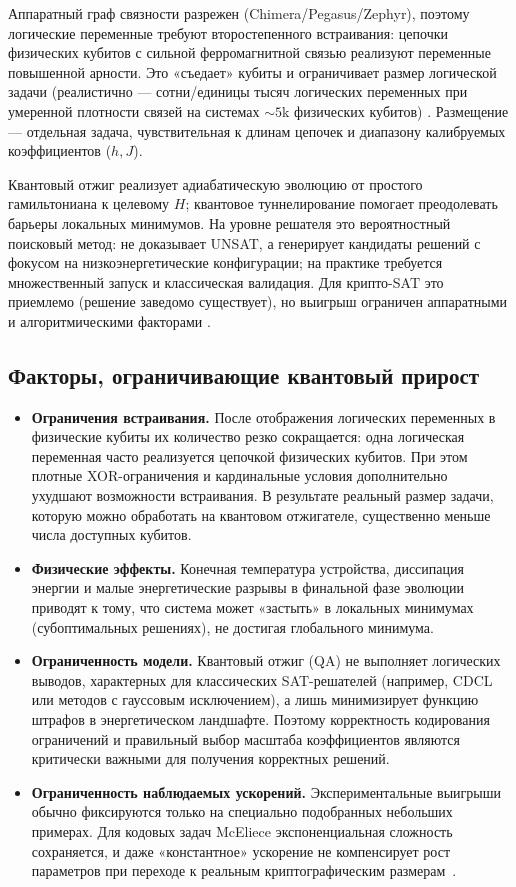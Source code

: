 Аппаратный граф связности разрежен (Chimera/Pegasus/Zephyr), поэтому логические переменные требуют второстепенного встраивания: цепочки физических кубитов с сильной ферромагнитной связью реализуют переменные повышенной арности. Это «съедает» кубиты и ограничивает размер логической задачи (реалистично --- сотни/единицы тысяч логических переменных при умеренной плотности связей на системах $\sim 5$k физических кубитов) \cite{DWaveDocs}. Размещение --- отдельная задача, чувствительная к длинам цепочек и диапазону калибруемых коэффициентов ($h, J$).

Квантовый отжиг реализует адиабатическую эволюцию от простого гамильтониана к целевому $H$; квантовое туннелирование помогает преодолевать барьеры локальных минимумов. На уровне решателя это вероятностный поисковый метод: не доказывает UNSAT, а генерирует кандидаты решений с фокусом на низкоэнергетические конфигурации; на практике требуется множественный запуск и классическая валидация. Для крипто-SAT это приемлемо (решение заведомо существует), но выигрыш ограничен аппаратными и алгоритмическими факторами \cite{Sirdey2023,Pei2025}.

\subsection*{Факторы, ограничивающие квантовый прирост}
\begin{itemize}
  \item \textbf{Ограничения встраивания.} После отображения логических переменных в физические кубиты их количество резко сокращается: одна логическая переменная часто реализуется цепочкой физических кубитов. При этом плотные XOR-ограничения и кардинальные условия дополнительно ухудшают возможности встраивания. В результате реальный размер задачи, которую можно обработать на квантовом отжигателе, существенно меньше числа доступных кубитов.
  
  \item \textbf{Физические эффекты.} Конечная температура устройства, диссипация энергии и малые энергетические разрывы в финальной фазе эволюции приводят к тому, что система может «застыть» в локальных минимумах (субоптимальных решениях), не достигая глобального минимума.
  
  \item \textbf{Ограниченность модели.} Квантовый отжиг (QA) не выполняет логических выводов, характерных для классических SAT-решателей (например, CDCL или методов с гауссовым исключением), а лишь минимизирует функцию штрафов в энергетическом ландшафте. Поэтому корректность кодирования ограничений и правильный выбор масштаба коэффициентов являются критически важными для получения корректных решений.
  
  \item \textbf{Ограниченность наблюдаемых ускорений.} Экспериментальные выигрыши обычно фиксируются только на специально подобранных небольших примерах. Для кодовых задач McEliece экспоненциальная сложность сохраняется, и даже «константное» ускорение не компенсирует рост параметров при переходе к реальным криптографическим размерам~\cite{Bian2018,Pei2025}.
\end{itemize}


